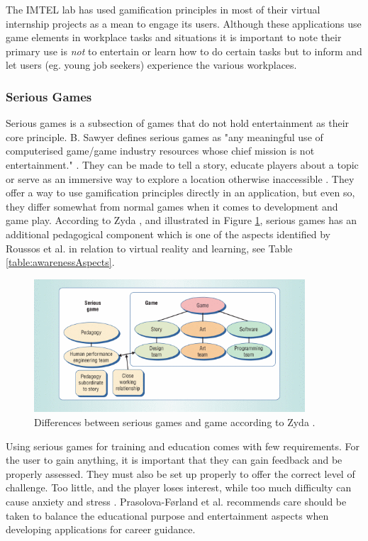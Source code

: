 The IMTEL lab has used gamification principles in most of their virtual internship projects as a mean to engage its users. Although these applications use game elements in workplace tasks and situations it is important to note their primary use is \textit{not} to entertain or learn how to do certain tasks but to inform and let users (eg. young job seekers) experience the various workplaces.      

\subsubsection{Serious Games}
Serious games is a subsection of games that do not hold entertainment as their core principle. B. Sawyer defines serious games as "any meaningful use of computerised game/game industry resources whose chief mission is not entertainment." \cite{sawyer2007serious}.
They can be made to tell a story, educate players about a topic or serve as an immersive way to explore a location otherwise inaccessible \cite{susi2007serious}. They offer a way to use gamification principles directly in an application, but even so, they differ somewhat from normal games when it comes to development and game play. According to Zyda \cite{zyda2005visual}, and illustrated in Figure \ref{fig:seriousGames}, serious games has an additional pedagogical component which is one of the aspects identified by Roussos et al. in relation to virtual reality and learning, see Table \ref{table:awarenessAspects}.   

\begin{figure}[!ht]
    \centering
    \includegraphics[width=0.9\textwidth]{./fig/background/seriousGames.png}
    \caption{Differences between serious games and game according to Zyda \cite{zyda2005visual}.}
    \label{fig:seriousGames}
\end{figure}

Using serious games for training and education comes with few requirements. For the user to gain anything, it is important that they can gain feedback and be properly assessed. They must also be set up properly to offer the correct level of challenge. Too little, and the player loses interest, while too much difficulty can cause anxiety and stress \cite{de2014serious}. Prasolova-Førland et al. \cite{prasolova2019empowering} recommends care should be taken to balance the educational purpose and entertainment aspects when developing applications for career guidance.

